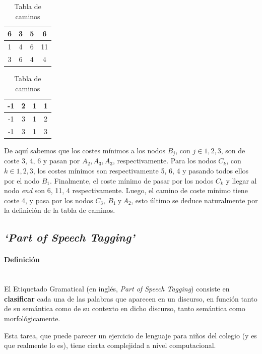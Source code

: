 \documentclass{article}
\newcommand{\myparagraph}[1]{\paragraph{#1}\mbox{}\\}
\begin{document}
\begin{table}[h!]
\centering

\begin{subtable}[t]{0.45\textwidth}
\centering\begin{tabular}{|c|c|c|c|}
\hline
6 & 3 & 5 & 6 \\ \hline
1 & 4 & 6 & 11 \\ \hline
3 & 6 & 4 & 4 \\ \hline
\end{tabular}
\caption{Tabla de costes}
\end{subtable}
\hspace{5mm}
\begin{subtable}[t]{0.45\textwidth}
\centering
\begin{tabular}{|c|c|c|c|}
\hline
-1 & 2 & 1 & 1\\ \hline
-1 & 3 & 1 & 2\\ \hline
-1 & 3 & 1 & 3\\ \hline
\end{tabular}
\caption{Tabla de caminos}
\end{subtable}
\end{table}

De aquí sabemos que los costes mínimos a los nodos $B_j$, con $j \in {1,2,3}$, son de coste {3, 4, 6} y pasan por {$A_2, A_3, A_3$}, 
respectivamente. Para los nodos $C_k$, con $k \in {1,2,3}$, los costes mínimos son respectivamente {5, 6, 4} y pasando todos ellos por el 
nodo $B_1$. Finalmente, el coste mínimo de pasar por los nodos $C_k$ y llegar al nodo \textit{end} son
{6, 11, 4} respectivamente. Luego, el camino de coste mínimo tiene coste 4, y pasa por los nodos $C_3,\: B_1\: \text{y} \:A_2$, esto último se deduce 
naturalmente por la definición de la tabla de caminos. 

\subsection{\textit{`Part of Speech Tagging'}}

\myparagraph{Definición}

El Etiquetado Gramatical (en inglés, \textit{Part of Speech Tagging}) consiste en \textbf{clasificar} cada una de las palabras que aparecen en un discurso, en función tanto de su semántica como de su contexto en dicho discurso, tanto semántica como morfológicamente.

Esta tarea, que puede parecer un ejercicio de lenguaje para niños del colegio (y es que realmente lo es), tiene cierta complejidad a nivel computacional. \\
\end{document}
